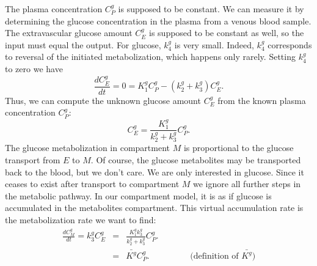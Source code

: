 The plasma concentration $C_P^g$ is supposed to be constant. We can
measure it by determining the glucose concentration in the plasma from
a venous blood sample. The extravascular glucose amount $C_E^g$ is
supposed to be constant as well, so the input must equal the
output. For glucose, $k_4^g$ is very small. Indeed, $k_4^g$
corresponds to reversal of the initiated metabolization, which happens
only rarely. Setting $k_4^g$ to zero we have
\begin{equation}
\frac{d C_E^g}{dt} = 0 = K_1^g C_P^g - (k_2^g + k_3^g) C_E^g.
\end{equation}
Thus, we can compute the unknown glucose amount $C_E^g$ from the known plasma
concentration $C_P^g$:
\begin{equation}
  C_E^g = \frac{K_1^g}{k_2^g + k_3^g} C_P^g.
\end{equation}
The glucose metabolization in compartment $M$ is proportional to the glucose
transport from $E$ to $M$. Of course, the glucose metabolites may be
transported back to the blood, but we don't care. We are only interested in
glucose. Since it ceases to exist after transport to compartment $M$ we ignore
all further steps in the metabolic pathway. In our compartment model, it is as
if glucose is accumulated in the metabolites compartment. This virtual
accumulation rate is the metabolization rate we want to find:
\begin{align}
  \frac{d C_M^g}{d t} = k_3^g C_E^g & = & 
   \frac{K_1^g k_3^g}{k_2^g + k_3^g} C_P^g.\\
  & = & \bar{K^g}  C_P^g. \hspace{2cm} \mbox{$($definition of } \bar{K^g})
\end{align}

